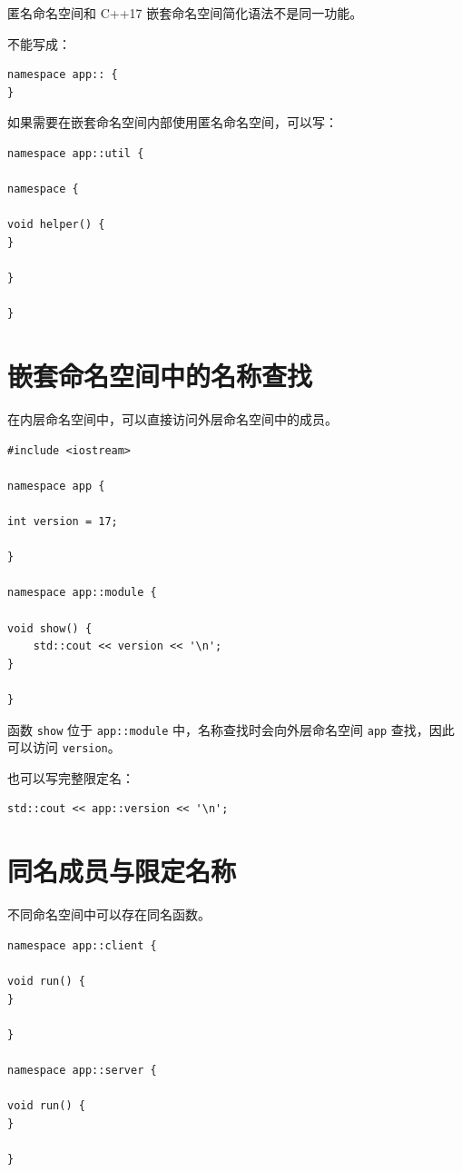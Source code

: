 \documentclass[UTF8,12pt,a4paper]{ctexart}
\begin{document}
匿名命名空间和 C++17 嵌套命名空间简化语法不是同一功能。

不能写成：

\begin{lstlisting}
namespace app:: {
}
\end{lstlisting}

如果需要在嵌套命名空间内部使用匿名命名空间，可以写：

\begin{lstlisting}
namespace app::util {

namespace {

void helper() {
}

}

}
\end{lstlisting}

\section{嵌套命名空间中的名称查找}

在内层命名空间中，可以直接访问外层命名空间中的成员。

\begin{lstlisting}
#include <iostream>

namespace app {

int version = 17;

}

namespace app::module {

void show() {
    std::cout << version << '\n';
}

}
\end{lstlisting}

函数 \texttt{show} 位于 \texttt{app::module} 中，名称查找时会向外层命名空间 \texttt{app} 查找，因此可以访问 \texttt{version}。

也可以写完整限定名：

\begin{lstlisting}
std::cout << app::version << '\n';
\end{lstlisting}

\section{同名成员与限定名称}

不同命名空间中可以存在同名函数。

\begin{lstlisting}
namespace app::client {

void run() {
}

}

namespace app::server {

void run() {
}

}
\end{lstlisting}
\end{document}
